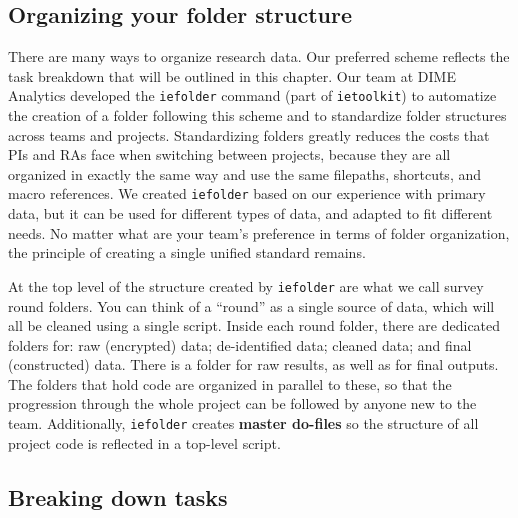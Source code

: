 \subsection{Organizing your folder structure}

There are many ways to organize research data.
Our preferred scheme reflects the task breakdown that will be outlined in this chapter.
Our team at DIME Analytics developed the \texttt{iefolder}
command (part of \texttt{ietoolkit})
to automatize the creation of a folder following this scheme and
to standardize folder structures across teams and projects.
Standardizing folders greatly reduces the costs that PIs and RAs face when switching between projects,
because they are all organized in exactly the same way
and use the same filepaths, shortcuts, and macro references.
We created \texttt{iefolder} based on our experience with primary data,
but it can be used for different types of data,
and adapted to fit different needs.
No matter what are your team's preference in terms of folder organization,
the principle of creating a single unified standard remains.

At the top level of the structure created by \texttt{iefolder} are what we call survey round folders.
You can think of a ``round'' as a single source of data,
which will all be cleaned using a single script.
Inside each round folder, there are dedicated folders for:
raw (encrypted) data; de-identified data; cleaned data; and final (constructed) data.
There is a folder for raw results, as well as for final outputs.
The folders that hold code are organized in parallel to these,
so that the progression through the whole project can be followed by anyone new to the team.
Additionally, \texttt{iefolder} creates \textbf{master do-files}
so the structure of all project code is reflected in a top-level script.

\subsection{Breaking down tasks}


